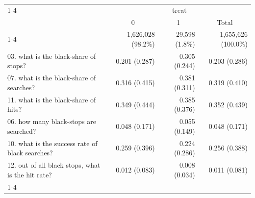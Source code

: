 \documentclass{article}
\begin{document}
\begin{table}[!h]
\centering
\begin{tabular}{llll}
\cline{1-4}
\multicolumn{1}{r}{} &
  \multicolumn{3}{c}{treat} \\
\multicolumn{1}{r}{} &
  \multicolumn{1}{c}{0} &
  \multicolumn{1}{c}{1} &
  \multicolumn{1}{c}{Total} \\
\cline{1-4}
\multicolumn{1}{l}{N} &
  \multicolumn{1}{r}{1,626,028 (98.2\%)} &
  \multicolumn{1}{r}{29,598 (1.8\%)} &
  \multicolumn{1}{r}{1,655,626 (100.0\%)} \\
\multicolumn{1}{l}{03. what is the black-share of stops?} &
  \multicolumn{1}{r}{0.201 (0.287)} &
  \multicolumn{1}{r}{0.305 (0.244)} &
  \multicolumn{1}{r}{0.203 (0.286)} \\
\multicolumn{1}{l}{07. what is the black-share of searches?} &
  \multicolumn{1}{r}{0.316 (0.415)} &
  \multicolumn{1}{r}{0.381 (0.311)} &
  \multicolumn{1}{r}{0.319 (0.410)} \\
\multicolumn{1}{l}{11. what is the black-share of hits?} &
  \multicolumn{1}{r}{0.349 (0.444)} &
  \multicolumn{1}{r}{0.385 (0.376)} &
  \multicolumn{1}{r}{0.352 (0.439)} \\
\multicolumn{1}{l}{06. how many black-stops are searched?} &
  \multicolumn{1}{r}{0.048 (0.171)} &
  \multicolumn{1}{r}{0.055 (0.149)} &
  \multicolumn{1}{r}{0.048 (0.171)} \\
\multicolumn{1}{l}{10. what is the success rate of black searches?} &
  \multicolumn{1}{r}{0.259 (0.396)} &
  \multicolumn{1}{r}{0.224 (0.286)} &
  \multicolumn{1}{r}{0.256 (0.388)} \\
\multicolumn{1}{l}{12. out of all black stops, what is the hit rate?} &
  \multicolumn{1}{r}{0.012 (0.083)} &
  \multicolumn{1}{r}{0.008 (0.034)} &
  \multicolumn{1}{r}{0.011 (0.081)} \\
\cline{1-4}
\end{tabular}
\end{table}
\end{document}
